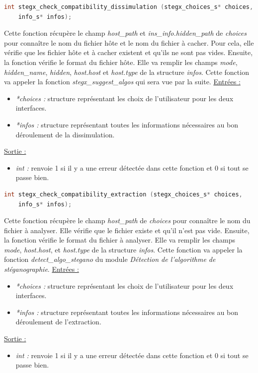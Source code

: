 \documentclass[11pt]{article}
\begin{document}
\begin{lstlisting}[language=c]
int stegx_check_compatibility_dissimulation (stegx_choices_s* choices, 
	info_s* infos);
\end{lstlisting}

Cette fonction récupère le champ \textit{host\_path} et \textit{ins\_info.hidden\_path}
de \textit{choices} pour connaître le nom du fichier hôte et le nom du fichier 
à cacher. 
Pour cela, elle vérifie que les fichier hôte et à cacher existent et qu'ils 
ne sont pas vides. Ensuite, la fonction vérifie le format du fichier hôte. 
Elle va remplir les champs \textit{mode}, \textit{hidden\_name}, \textit{hidden},
\textit{host.host} et \textit{host.type} de la structure \textit{infos}. 
Cette fonction va appeler la fonction \textit{stegx\_suggest\_algos} 
qui sera vue par la suite. 
\newline
\underline{Entrées :}
\begin{itemize}
\item \textit{*choices :} structure représentant les choix de 
l'utilisateur pour les deux interfaces. 
\item \textit{*infos :} structure représentant toutes les informations 
nécessaires au bon déroulement de la dissimulation. 
\end{itemize}
\underline{Sortie :}
\begin{itemize}
\item \textit{int :} renvoie 1 si il y a une erreur détectée dans cette 
fonction et 0 si tout se passe bien.
\newline 
\end{itemize}

\begin{lstlisting}[language=c]
int stegx_check_compatibility_extraction (stegx_choices_s* choices, 
	info_s* infos);
\end{lstlisting}

Cette fonction récupère le champ \textit{host\_path} 
de \textit{choices} pour connaître le nom du fichier à analyser. 
Elle vérifie que le fichier existe et qu'il n'est pas vide. Ensuite, la 
fonction vérifie le format du fichier à analyser. 
Elle va remplir les champs \textit{mode}, \textit{host.host}, 
et \textit{host.type} de la structure \textit{infos}. 
Cette fonction va appeler la fonction \textit{detect\_algo\_stegano} du 
module \textit{Détection de l'algorithme de stéganographie}. 
\newline
\underline{Entrées :}
\begin{itemize}
\item \textit{*choices :} structure représentant les choix de 
l'utilisateur pour les deux interfaces. 
\item \textit{*infos :} structure représentant toutes les informations 
nécessaires au bon déroulement de l'extraction. 
\end{itemize}
\underline{Sortie :}
\begin{itemize}
\item \textit{int :} renvoie 1 si il y a une erreur détectée dans cette 
fonction et 0 si tout se passe bien.
\newline 
\end{itemize}
\end{document}
